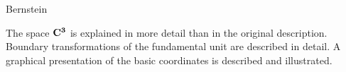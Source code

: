 \documentclass[]{iucr}              %
\numberwithin{equation}{section}
\newcommand{\CIII}[0]{$\bf{C^{3}}$}
\begin{document}
	
	\author[b]{Herbert J.}{Bernstein}
	
	
	
	
	
	
	
	\keyword{\CIII}
	
	
	
	\maketitle                        %
	
	\begin{synopsis}
		The space \CIII{} is explained in more detail than
		in the original description. Boundary transformations
		of the fundamental unit are described in detail. 
		A graphical presentation of the basic coordinates
		is described and illustrated.
	\end{synopsis}
	\newcommand{\si}[0]{$s_1$}
	\newcommand{\sii}[0]{$s_2$}
	\newcommand{\siii}[0]{$s_3$}
	\newcommand{\siv}[0]{$s_4$}
	\newcommand{\sv}[0]{$s_5$}
	\newcommand{\svi}[0]{$s_6$}
	\newcommand{\Svec} [0] {\{\si, \sii, \siii, \siv, \sv, \svi \}}
	\newcommand{\SvecA} [0] {\{-\si, -\si+\sii, \si+\siii, \si+\sv, \si+\siv, \si+\svi \}}
	
\end{document}
